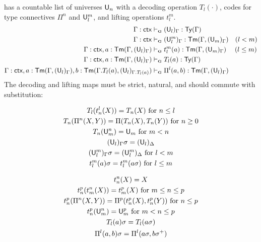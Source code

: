\begin{definition}
    \ThyGAT has a countable list of universes $\mathsf{U}_n$ with a decoding operation $T_l(\cdot)$, 
    codes for type connectives $\Pi^n$ and $\mathsf{U}_l^m$, and lifting operations $t_l^m$.
    \begin{align*}
            \Gamma : \ctx &\vdashG (\U_l)_\Gamma : \Type(\Gamma)\\
            \Gamma : \ctx &\vdashG (\U_l^m)_\Gamma : \Elem(\Gamma,(\U_m)_\Gamma) \quad (l < m)\\
            \Gamma : \ctx, a : \Elem(\Gamma,(\U_l)_\Gamma) &\vdashG t_l^m(a) : \Elem(\Gamma,(\U_m)_\Gamma) \quad\; (l\leq m)\\
            \Gamma : \ctx, a : \Elem(\Gamma,(\U_l)_\Gamma) &\vdashG T_l(a) : \Type(\Gamma)\\
            \Gamma : \ctx, a : \Elem(\Gamma,(\U_l)_\Gamma),  b : \Elem(\Gamma.T_l(a),(\U_l)_{\Gamma.T_l(a)}) &\vdashG \Pi^l(a,b) : \Elem(\Gamma,(\U_l)_\Gamma)
    \end{align*}
    The decoding and lifting maps must be strict, natural, and should commute with substitution:

    \noindent
    \begin{minipage}{0.45\linewidth}
        \begin{gather*}
            T_l(t_n^l(X)) = T_n(X) \text{ for } n \leq l \\
            T_n(\Pi^n(X,Y)) = \Pi(T_n(X), T_n(Y)) \text{ for } n \geq 0\\
            T_n(\mathsf{U}_m^n) = \mathsf{U}_m \text{ for } m < n\\
            (\mathsf{U}_l)_\Gamma\sigma = (\mathsf{U}_l)_\Delta \\
            (\mathsf{U}_l^m)_\Gamma\sigma = (\mathsf{U}_l^m)_\Delta \text{ for } l < m \\
            t_l^m(a)\sigma = t_l^m(a\sigma) \text{ for } l \leq m
        \end{gather*}
    \end{minipage}
    \hfill
    \begin{minipage}{0.50\linewidth}
        \begin{gather*}
            t_n^n(X) = X \\
            t_n^p(t_m^n(X)) = t_m^p(X) \text{ for } m \leq n \leq p \\
            t_n^p(\Pi^n(X,Y)) = \Pi^p(t_n^p(X),t_n^p(Y)) \text{ for } n \leq p \\
            t_n^p(\mathsf{U}_m^n) = \mathsf{U}_m^p \text{ for } m < n \leq p\\
            T_l(a)\sigma = T_l(a\sigma) \\
            \Pi^l(a,b)\sigma = \Pi^l(a\sigma, b\sigma^+)
        \end{gather*}
    \end{minipage}
\end{definition}

